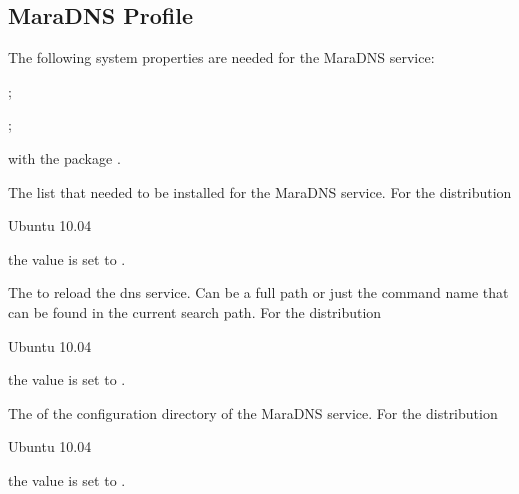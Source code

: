 \label{sec:maradns_profile}
\subsection{MaraDNS Profile}

The following system properties are needed for the MaraDNS service:

\begin{compactitem}
\item {};
\item {};
\item {} with the package .
\end{compactitem}


The  list that needed to be installed for the MaraDNS service.
For the distribution
\begin{inparaitem}
\item[\TheDistribution{ubuntu}] Ubuntu 10.04
\end{inparaitem}
the value is set to .


The  to reload the dns service. Can be a full path or
just the command name that can be found in the current search path.
For the distribution
\begin{inparaitem}
\item[\TheDistribution{ubuntu}] Ubuntu 10.04
\end{inparaitem}
the value is set to .


The  of the configuration directory of the MaraDNS service. 
For the distribution
\begin{inparaitem}
\item[\TheDistribution{ubuntu}] Ubuntu 10.04
\end{inparaitem}
the value is set to .


